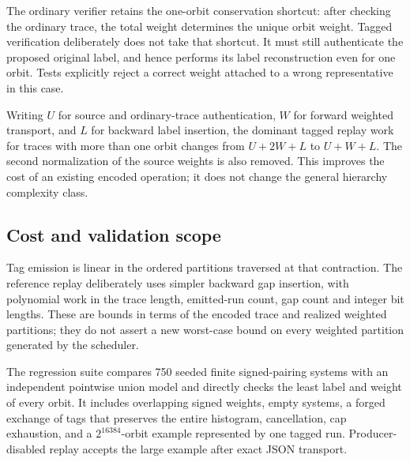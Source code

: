 The ordinary verifier retains the one-orbit conservation shortcut: after
checking the ordinary trace, the total weight determines the unique orbit
weight. Tagged verification deliberately does not take that shortcut.
It must still authenticate the proposed original label, and hence performs
its label reconstruction even for one orbit. Tests explicitly reject a
correct weight attached to a wrong representative in this case.

Writing $U$ for source and ordinary-trace authentication, $W$ for forward
weighted transport, and $L$ for backward label insertion, the dominant tagged
replay work for traces with more than one orbit changes from $U+2W+L$ to $U+W+L$. The second normalization of the
source weights is also removed. This improves the cost of an existing encoded
operation; it does not change the general hierarchy complexity class.



\subsection{Cost and validation scope}

Tag emission is linear in the ordered partitions traversed at that
contraction. The reference replay deliberately uses simpler backward gap
insertion, with polynomial work in the trace length, emitted-run count,
gap count and integer bit lengths. These are bounds in terms of the encoded
trace and realized weighted partitions; they do not assert a new worst-case
bound on every weighted partition generated by the scheduler.

The regression suite compares 750 seeded finite signed-pairing systems with
an independent pointwise union model and directly checks the least label and
weight of every orbit. It includes overlapping signed weights, empty systems,
a forged exchange of tags that preserves the entire histogram, cancellation,
cap exhaustion, and a $2^{16384}$-orbit example represented by one tagged run.
Producer-disabled replay accepts the large example after exact JSON transport.
